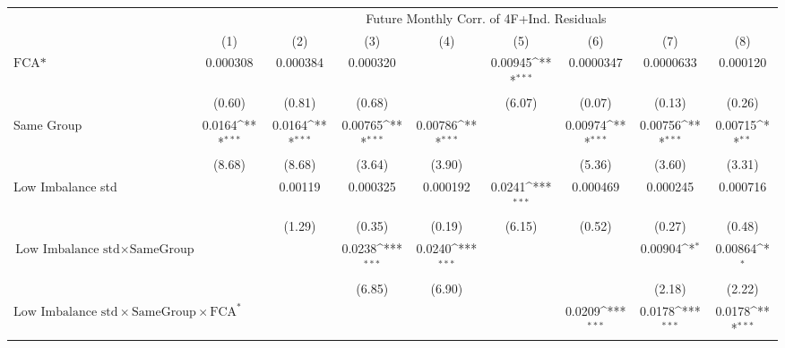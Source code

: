 {
\def\sym#1{\ifmmode^{#1}\else\(^{#1}\)\fi}
\begin{tabular}{l*{8}{c}}
\hline\hline
                &\multicolumn{8}{c}{Future Monthly Corr. of 4F+Ind. Residuals}                                                                                          \\\cmidrule(lr){2-9}
                &\multicolumn{1}{c}{(1)}         &\multicolumn{1}{c}{(2)}         &\multicolumn{1}{c}{(3)}         &\multicolumn{1}{c}{(4)}         &\multicolumn{1}{c}{(5)}         &\multicolumn{1}{c}{(6)}         &\multicolumn{1}{c}{(7)}         &\multicolumn{1}{c}{(8)}         \\
\hline
$ \text{FCA*} $ & 0.000308         & 0.000384         & 0.000320         &                  &  0.00945\sym{***}&0.0000347         &0.0000633         & 0.000120         \\
                &   (0.60)         &   (0.81)         &   (0.68)         &                  &   (6.07)         &   (0.07)         &   (0.13)         &   (0.26)         \\
[1em]
Same Group      &   0.0164\sym{***}&   0.0164\sym{***}&  0.00765\sym{***}&  0.00786\sym{***}&                  &  0.00974\sym{***}&  0.00756\sym{***}&  0.00715\sym{**} \\
                &   (8.68)         &   (8.68)         &   (3.64)         &   (3.90)         &                  &   (5.36)         &   (3.60)         &   (3.31)         \\
[1em]
Low Imbalance std&                  &  0.00119         & 0.000325         & 0.000192         &   0.0241\sym{***}& 0.000469         & 0.000245         & 0.000716         \\
                &                  &   (1.29)         &   (0.35)         &   (0.19)         &   (6.15)         &   (0.52)         &   (0.27)         &   (0.48)         \\
[1em]
 $ \text{Low Imbalance std} \times {\text{SameGroup} } $ &                  &                  &   0.0238\sym{***}&   0.0240\sym{***}&                  &                  &  0.00904\sym{*}  &  0.00864\sym{*}  \\
                &                  &                  &   (6.85)         &   (6.90)         &                  &                  &   (2.18)         &   (2.22)         \\
[1em]
 $ \text{Low Imbalance std} \times {\text{SameGroup} } \times \text{FCA}^*  $ &                  &                  &                  &                  &                  &   0.0209\sym{***}&   0.0178\sym{***}&   0.0178\sym{***}\\

\end{tabular}}
